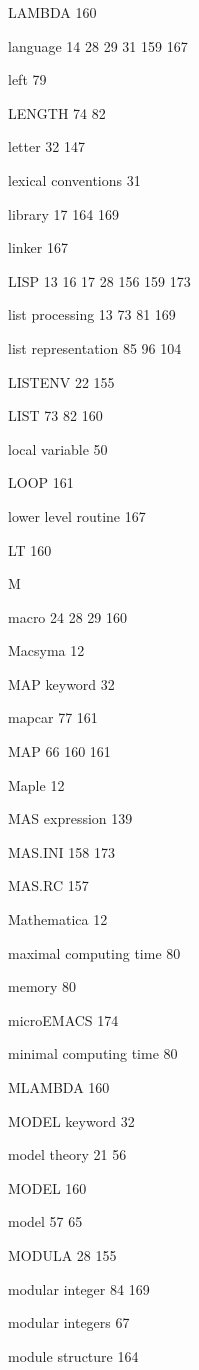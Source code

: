 \item LAMBDA 160
\item language  14 28 29 31 159 167
\item left 79
\item LENGTH  74 82
\item letter  32 147
\item lexical conventions 31
\item library  17  164 169
\item linker 167
\item LISP  13 16 17 28 156 159 173
\item list processing  13 73 81 169
\item list representation  85 96 104
\item LISTENV  22 155
\item LIST  73 82 160
\item local variable 50
\item LOOP 161
\item lower level routine 167
\item LT 160
\indexspace
\item {\Large M}
\item macro  24 28 29 160
\item Macsyma 12
\item MAP keyword 32
\item mapcar  77 161
\item MAP  66  160 161
\item Maple 12
\item MAS expression 139
\item MAS.INI  158 173
\item MAS.RC 157
\item Mathematica 12
\item maximal computing time 80
\item memory 80
\item microEMACS 174
\item minimal computing time 80
\item MLAMBDA 160
\item MODEL keyword 32
\item model theory  21 56
\item MODEL 160
\item model  57 65
\item MODULA  28 155
\item modular integer  84 169
\item modular integers 67
\item module structure 164
